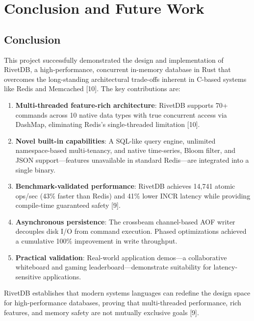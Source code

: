 \documentclass[12pt,a4paper]{report}
\begin{document}
\chapter{Conclusion and Future Work}

\section{Conclusion}

This project successfully demonstrated the design and implementation of RivetDB, a high-performance, concurrent in-memory database in Rust that overcomes the long-standing architectural trade-offs inherent in C-based systems like Redis and Memcached [10]. The key contributions are:

\begin{enumerate}[leftmargin=2.5em]
    \item \textbf{Multi-threaded feature-rich architecture}: RivetDB supports 70+ commands across 10 native data types with true concurrent access via DashMap, eliminating Redis's single-threaded limitation [10].

    \item \textbf{Novel built-in capabilities}: A SQL-like query engine, unlimited namespace-based multi-tenancy, and native time-series, Bloom filter, and JSON support---features unavailable in standard Redis---are integrated into a single binary.

    \item \textbf{Benchmark-validated performance}: RivetDB achieves 14,741 atomic ops/sec (43\% faster than Redis) and 41\% lower INCR latency while providing compile-time guaranteed safety [9].

    \item \textbf{Asynchronous persistence}: The crossbeam channel-based AOF writer decouples disk I/O from command execution. Phased optimizations achieved a cumulative 100\% improvement in write throughput.

    \item \textbf{Practical validation}: Real-world application demos---a collaborative whiteboard and gaming leaderboard---demonstrate suitability for latency-sensitive applications.
\end{enumerate}

RivetDB establishes that modern systems languages can redefine the design space for high-performance databases, proving that multi-threaded performance, rich features, and memory safety are not mutually exclusive goals [9].
\end{document}
